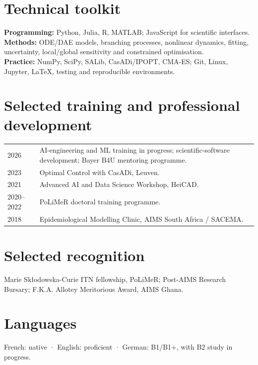 \documentclass[10pt,a4paper]{article}
\begin{document}
\section{Technical toolkit}
\textbf{Programming:} Python, Julia, R, MATLAB; JavaScript for scientific interfaces.\\
\textbf{Methods:} ODE/DAE models, branching processes, nonlinear dynamics, fitting, uncertainty, local/global sensitivity and constrained optimisation.\\
\textbf{Practice:} NumPy, SciPy, SALib, CasADi/IPOPT, CMA-ES; Git, Linux, Jupyter, LaTeX, testing and reproducible environments.
\section{Selected training and professional development}
\begin{tabularx}{\linewidth}{@{}p{24mm}X@{}}
2026 & AI-engineering and ML training in progress; scientific-software development; Bayer B4U mentoring programme.\\[5pt]
2023 & Optimal Control with CasADi, Leuven.\\[5pt]
2021 & Advanced AI and Data Science Workshop, HeiCAD.\\[5pt]
2020–2022 & PoLiMeR doctoral training programme.\\[5pt]
2018 & Epidemiological Modelling Clinic, AIMS South Africa / SACEMA.
\end{tabularx}
\section{Selected recognition}
Marie Skłodowska-Curie ITN fellowship, PoLiMeR; Post-AIMS Research Bursary; F.K.A. Allotey Meritorious Award, AIMS Ghana.
\section{Languages}
French: native · English: proficient · German: B1/B1+, with B2 study in progress.
\end{document}
